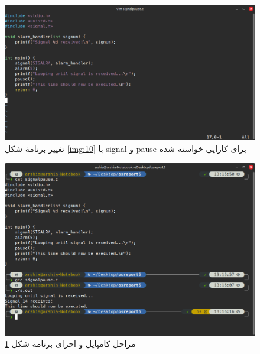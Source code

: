 \documentclass[12pt]{article}
\begin{document}
	\begin{figure}[H]
		\centering
		\includegraphics[width=\textwidth]{report5-resources/11.png}
		\caption{تغییر برنامهٔ شکل \ref{img:10} با \textenglish{signal} و \textenglish{pause} برای کارایی خواسته شده}
		\label{img:11}
	\end{figure}
	\begin{figure}[H]
		\centering
		\includegraphics[width=\textwidth]{report5-resources/12.png}
		\caption{مراحل کامپایل و احرای برنامهٔ شکل \ref{img:11}}
		\label{img:12}
	\end{figure}
\end{document}
